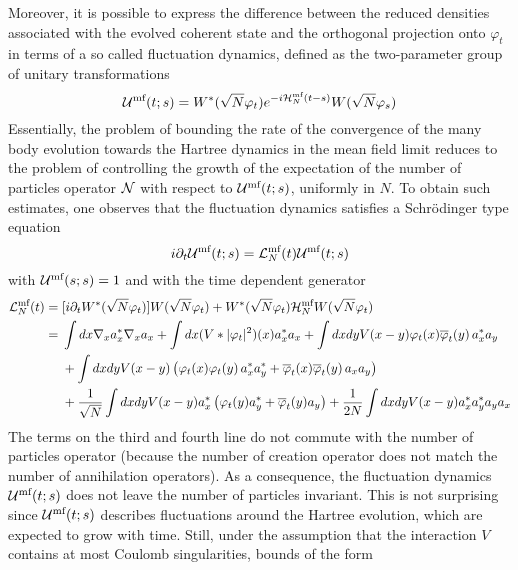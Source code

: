 \documentclass[11pt,a4paper]{article}
\newcommand{\cU}{{\cal U}}
\newcommand{\cH}{{\cal H}}
\newcommand{\cL}{{\cal L}}
\newcommand{\cN}{{\cal N}}
\begin{document}
Moreover, it is possible to express the difference between the reduced densities associated with the evolved coherent state and the orthogonal projection onto $\varphi_t$ in terms of a so called fluctuation dynamics, defined as the two-parameter group of unitary transformations
\begin{equation}\label{eq:cU-mf} \cU^{\text{mf}} (t;s) = W^* (\sqrt{N} \varphi_t) e^{-i \cH^{\text{mf}}_N (t-s)} W(\sqrt{N} \varphi_s) \end{equation}
Essentially, the problem of bounding the rate of the convergence of the many body evolution towards the Hartree dynamics in the mean field limit reduces to the problem of controlling the growth of the expectation of the number of particles operator $\cN$ with respect to $\cU^{\text{mf}} (t;s)$, uniformly in $N$. To obtain such estimates, one observes that the fluctuation dynamics satisfies a Schr\"odinger type equation
\[ i\partial_t \cU^{\text{mf}} (t;s) = \cL^{\text{mf}}_N (t) \cU^{\text{mf}} (t;s) \]
with $\cU^{\text{mf}} (s;s) = 1$ and with the time dependent generator
\begin{equation}\label{eq:cL-mf} \begin{split} 
\cL^{\text{mf}}_N (t) = \; & [i\partial_t W^* (\sqrt{N} \varphi_t)] W(\sqrt{N} \varphi_t) + W^* (\sqrt{N} \varphi_t) \cH^{\text{mf}}_N W(\sqrt{N} \varphi_t) \\  = \; &\int dx \nabla_x a_x^* \nabla_x a_x + \int dx ( V*|\varphi_t|^2) (x) a_x^* a_x + \int dx dy V(x-y) \varphi_t (x) \overline{\varphi}_t (y) \, a_x^* a_y \\ &+  \int dx dy V(x-y)  \left(\varphi_t (x) \varphi_t (y) \, a_x^* a^*_y + \overline{\varphi}_t (x) \overline{\varphi}_t (y) \, a_x a_y \right) \\
&+\frac{1}{\sqrt{N}} \int dx dy V(x-y) a_x^* \left( \varphi_t (y) a_y^* + \overline{\varphi}_t (y) a_y \right) + \frac{1}{2N} \int dx dy V(x-y) a_x^* a_y^* a_y a_x \end{split} \end{equation}
The terms on the third and fourth line do not commute with the number of particles operator (because the number of creation operator does not match the number of annihilation operators). As a consequence, the fluctuation dynamics $\cU^{\text{mf}} (t;s)$ does not leave the number of particles invariant. This is not surprising since $\cU^{\text{mf}} (t;s)$ describes fluctuations around the Hartree evolution, which are expected to grow with time. Still, under the assumption that the interaction $V$ contains at most Coulomb singularities, bounds of the form
\end{document}
